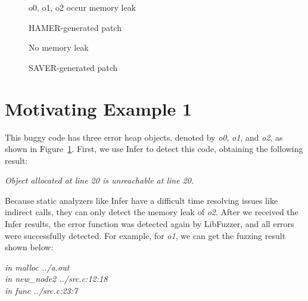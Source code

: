 \documentclass[a4paper,11pt,oneside,openany]{book}
\begin{document}
\begin{figure*}
  \begin{subfigure}{0.47\textwidth}
    
    \caption{o0, o1, o2 occur memory leak}
    \label{me1a}
  \end{subfigure}\hfill
  \begin{subfigure}{0.45\textwidth}
    
    \caption{HAMER-generated patch}
    \label{me1b}
  \end{subfigure}
  \caption{Motivating Example 1: Infer false-negative alarm} 
  \label{me1}
\end{figure*}

\begin{figure*}
  \begin{subfigure}{0.47\textwidth}
    
    \caption{No memory leak}
  \end{subfigure}\hfill
  \begin{subfigure}{0.45\textwidth}
    
    \caption{SAVER-generated patch}
  \end{subfigure}
  \caption{Motivating Example 2: Infer false-positive alarm}
  \label{me2}
\end{figure*}

\section{Motivating Example 1}
This buggy code has three error heap objects, denoted by {\it o0}, {\it o1}, and {\it o2}, as shown in Figure~\ref{me1a}. First, we use Infer to detect this code, obtaining the following result:

\begin{minipage}{\textwidth}
\vspace{0.2cm}
\textsl{\hspace{0.3cm}Object allocated at line 20 is unreachable at line 20.\\}
\end{minipage}

Because static analyzers like Infer have a difficult time resolving issues like indirect calls, they can only detect the memory leak of {\it o2}. After we received the Infer results, the error function was detected again by LibFuzzer, and all errors were successfully detected. For example, for {\it o1}, we can get the fuzzing result shown below:


\begin{minipage}{\textwidth}
    \vspace{0.2cm}
    \textsl{\hspace{0.3cm}in malloc ../a.out\\\hspace{0.3cm}in new\_node2 ../src.c:12:18\\\hspace{0.3cm}in func ../src.c:23:7\\}
\end{minipage}
\end{document}
